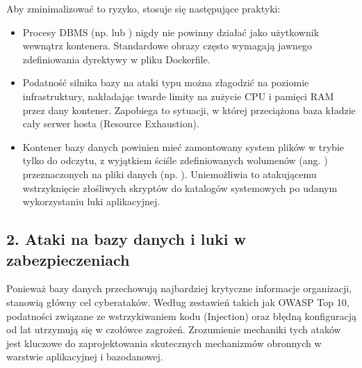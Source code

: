 \documentclass[a4paper,11pt,english,openany,oneside]{sphinxmanual}
\begin{document}
\sphinxAtStartPar
Aby zminimalizować to ryzyko, stosuje się następujące praktyki:
\begin{itemize}
\item {} 
\sphinxAtStartPar
{} Procesy DBMS (np.  lub ) nigdy nie powinny działać jako użytkownik  wewnątrz kontenera. Standardowe obrazy często wymagają jawnego zdefiniowania dyrektywy  w pliku Dockerfile.

\item {} 
\sphinxAtStartPar
{} Podatność silnika bazy na ataki typu  można złagodzić na poziomie infrastruktury, nakładając twarde limity na zużycie CPU i pamięci RAM przez dany kontener. Zapobiega to sytuacji, w której przeciążona baza kładzie cały serwer hosta (Resource Exhaustion).

\item {} 
\sphinxAtStartPar
{} Kontener bazy danych powinien mieć zamontowany system plików w trybie tylko do odczytu, z wyjątkiem ściśle zdefiniowanych wolumenów (ang. ) przeznaczonych na pliki danych (np. ). Uniemożliwia to atakującemu wstrzyknięcie złośliwych skryptów do katalogów systemowych po udanym wykorzystaniu luki aplikacyjnej.

\end{itemize}

\sphinxstepscope


\subsection{2. Ataki na bazy danych i luki w zabezpieczeniach}
\label{\detokenize{rozdzial_2/rozdzial_27/rozdzial_2:ataki-na-bazy-danych-i-luki-w-zabezpieczeniach}}\label{\detokenize{rozdzial_2/rozdzial_27/rozdzial_2::doc}}
\sphinxAtStartPar
Ponieważ bazy danych przechowują najbardziej krytyczne informacje organizacji, stanowią główny cel cyberataków. Według zestawień takich jak OWASP Top 10, podatności związane ze wstrzykiwaniem kodu (Injection) oraz błędną konfiguracją od lat utrzymują się w czołówce zagrożeń. Zrozumienie mechaniki tych ataków jest kluczowe do zaprojektowania skutecznych mechanizmów obronnych w warstwie aplikacyjnej i bazodanowej.
\end{document}
